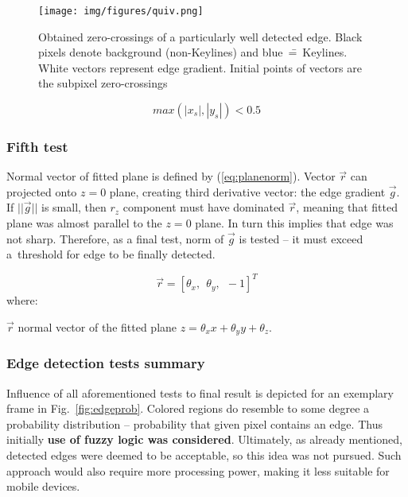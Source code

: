 \begin{figure}[ht]
	\centering\texttt{[image: img/figures/quiv.png]}
	\caption{ Obtained zero-crossings of a particularly well detected edge. Black pixels denote background (non-Keylines) and blue~\==~Keylines. White vectors represent edge gradient. Initial points of vectors are the subpixel zero-crossings }
	\label{fig:quiv}
\end{figure}

\begin{equation}
max(|x_s|, |y_s|) < 0.5
\label{eq:subpix_inside}
\end{equation}

\subsubsection{Fifth test}
\label{edge_fith}

Normal vector of fitted plane is defined by (\ref{eq:planenorm}). Vector $\vec{r}$ can projected onto $z=0$ plane, creating third derivative vector: the edge gradient $\vec{g}$. If $||\vec{g}||$ is small, then $r_{z}$ component must have dominated $\vec{r}$, meaning that fitted plane was almost parallel to the $z=0$ plane. In turn this implies that edge was not sharp. Therefore, as a final test, norm of $\vec{g}$ is tested -- it must exceed a~threshold for edge to be finally detected.

\begin{equation}
\vec{r} = [\theta_{x},\ \ \theta_{y},\ \ -1]^T
\label{eq:planenorm}
\end{equation}
where:
\begin{eqwhere}[2cm]
	\item[$\vec{r}$] normal vector of the fitted plane $z = \theta_{x}x + \theta_{y}y + \theta_{z}$.
\end{eqwhere}

\subsubsection{Edge detection tests summary}

Influence of all aforementioned tests to final result is depicted for an exemplary frame in Fig.~\ref{fig:edgeprob}. Colored regions do resemble to some degree a probability distribution -- probability that given pixel contains an edge. Thus initially \textbf{use of fuzzy logic was considered}. Ultimately, as already mentioned, detected edges were deemed to be acceptable, so this idea was not pursued. Such approach would also require more processing power, making it less suitable for mobile devices.

